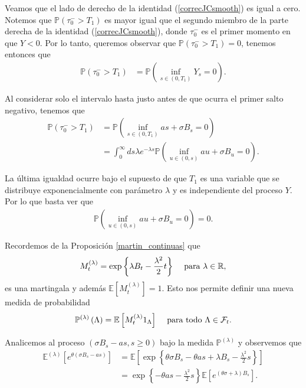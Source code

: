 Veamos que el lado de derecho de la identidad (\ref{correcJCsmooth}) es igual a cero. Notemos que $\mathbb{P}(\tau_0^{-} > T_1)$ es mayor igual que el segundo miembro de la parte derecha de la identidad (\ref{correcJCsmooth}), donde $\tau_0^{-}$ es el primer momento en que $Y < 0$. Por lo tanto, queremos observar que $\mathbb{P}(\tau_0^{-} > T_1) = 0$, tenemos entonces que
\begin{align*}
	\mathbb{P}(\tau_0^{-} > T_1) & = \mathbb{P}\left( \inf_{s \in (0, T_1)} Y_s = 0 \right).
\end{align*}

Al considerar solo el intervalo hasta justo antes de que ocurra el primer salto negativo, tenemos que
\begin{align*}
	\mathbb{P}(\tau_0^{-} > T_1) & = \mathbb{P}\left( \inf_{s \in (0, T_1)} as + \sigma B_s = 0 \right) \\
    & = \int_0^{\infty} ds \lambda e^{- \lambda s} \mathbb{P} \left( \inf_{u \in (0, s)} au + \sigma B_u = 0 \right).
\end{align*}

La última igualdad ocurre bajo el supuesto de que $T_1$ es una variable que se distribuye exponencialmente con parámetro $\lambda$ y es independiente del proceso $Y$. Por lo que basta ver que
\begin{align}
	\mathbb{P} \left( \inf_{u \in (0, s)} au + \sigma B_u = 0 \right) = 0. \label{antesdeT12}
\end{align}

Recordemos de la Proposición \ref{martin_continuas} que 
\begin{align*}
	M_t^{(\lambda)} = \exp \left\{ \lambda B_t - \frac{\lambda^2}{2} t \right\} \hspace{0.3cm} \text{ para } \lambda \in \mathbb{R},
\end{align*}
es una martingala y además $\mathbb{E}[M_t^{(\lambda)}] = 1$. Esto nos permite definir una nueva medida de probabilidad
\begin{align*}
	\mathbb{P}^{(\lambda)} \left(\Lambda \right) = \mathbb{E} \left[ M_t^{(\lambda)} 1_{\Lambda} \right] \hspace{0.3cm} \text{ para todo } \Lambda \in \mathcal{F}_t.
\end{align*}

Analicemos al proceso $(\sigma B_s - as, s \geq 0)$ bajo la medida $\mathbb{P}^{(\lambda)}$ y observemos que
\begin{align*}
	\mathbb{E}^{(\lambda)} \left[ e^{\theta (\sigma B_s - as)} \right] & = \mathbb{E} \left[ \exp \left\{ \theta \sigma B_s - \theta a s +  \lambda B_s - \frac{\lambda^2}{2} s \right\} \right] \\
    & = \exp \left\{ - \theta a s - \frac{\lambda^2}{2} s \right\} \mathbb{E} \left[ e^{ (\theta \sigma +  \lambda) B_s } \right].
\end{align*}

